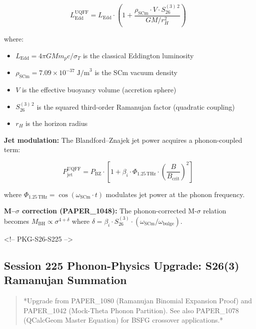\documentclass[12pt,a4paper]{article}
\begin{document}
\begin{equation}
L_{\text{Edd}}^{\text{UQFF}} = L_{\text{Edd}} \cdot \left(1 + \frac{\rho_{\text{SCm}} \cdot V \cdot S_{26}^{(3)\,2}}{G M / r_H^2}\right)
\end{equation}

where:

\begin{itemize}
  \item $L_{\text{Edd}} = 4\pi G M m_p c / \sigma_T$ is the classical Eddington luminosity
  \item $\rho_{\text{SCm}} = 7.09 \times 10^{-37}\;\text{J/m}^3$ is the SCm vacuum density
  \item $V$ is the effective buoyancy volume (accretion sphere)
  \item $S_{26}^{(3)\,2}$ is the squared third-order Ramanujan factor (quadratic coupling)
  \item $r_H$ is the horizon radius
\end{itemize}

\textbf{Jet modulation:} The Blandford--Znajek jet power acquires a phonon-coupled term:

\begin{equation}
P_{\text{jet}}^{\text{UQFF}} = P_{\text{BZ}} \cdot \left[1 + \beta_i \cdot \Phi_{1.25\,\text{THz}} \cdot \left(\frac{B}{B_{\text{crit}}}\right)^2\right]
\end{equation}

where $\Phi_{1.25\,\text{THz}} = \cos(\omega_{\text{SCm}} \cdot t)$ modulates jet power at the phonon frequency.

\textbf{M--$\sigma$ correction (PAPER\_1048):} The phonon-corrected M-$\sigma$ relation becomes $M_{\text{BH}} \propto \sigma^{4+\delta}$ where $\delta = \beta_i \cdot S_{26}^{(3)} \cdot (\omega_{\text{SCm}}/\omega_{\text{bulge}})$.

<!-- PKG-S26-S225 -->

\subsection{Session 225 Phonon-Physics Upgrade: S26(3) Ramanujan Summation}

\begin{quote}
*Upgrade from PAPER\_1080 (Ramanujan Binomial Expansion Proof) and
PAPER\_1042 (Mock-Theta Phonon Partition).  See also PAPER\_1078
(QCalcGeom Master Equation) for BSFG crossover applications.*
\end{quote}
\end{document}
